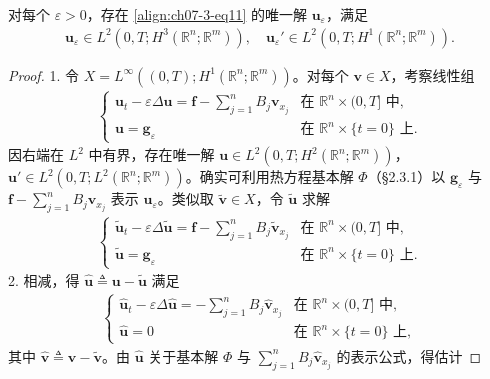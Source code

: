 \documentclass[../../main.tex]{subfiles}
\begin{document}
\begin{theorem}[逼近解的存在性]\label{theorem:ch07-3-1-逼近解存在}
对每个 $\varepsilon>0$，存在 \eqref{align:ch07-3-eq11} 的唯一解 $\mathbf{u}_\varepsilon$，满足
\begin{align}
\mathbf{u}_\varepsilon\in L^2(0,T;H^3(\mathbb{R}^n;\mathbb{R}^m)),\quad \mathbf{u}_\varepsilon{}'\in L^2(0,T;H^1(\mathbb{R}^n;\mathbb{R}^m)).\label{align:ch07-3-eq12}
\end{align}
\begin{proof}
1. 令 $X=L^\infty((0,T);H^1(\mathbb{R}^n;\mathbb{R}^m))$。对每个 $\mathbf{v}\in X$，考察线性组
\begin{align*}
\begin{cases}
\mathbf{u}_t-\varepsilon\Delta\mathbf{u}=\mathbf{f}-\sum_{j=1}^n B_j\mathbf{v}_{x_j}&\text{在 }\mathbb{R}^n\times(0,T]\text{ 中},\\
\mathbf{u}=\mathbf{g}_\varepsilon&\text{在 }\mathbb{R}^n\times\{t=0\}\text{ 上}.
\end{cases}
\end{align*}
因右端在 $L^2$ 中有界，存在唯一解 $\mathbf{u}\in L^2(0,T;H^2(\mathbb{R}^n;\mathbb{R}^m))$，$\mathbf{u}'\in L^2(0,T;L^2(\mathbb{R}^n;\mathbb{R}^m))$。确实可利用热方程基本解 $\Phi$（\S2.3.1）以 $\mathbf{g}_\varepsilon$ 与 $\mathbf{f}-\sum_{j=1}^n B_j\mathbf{v}_{x_j}$ 表示 $\mathbf{u}_\varepsilon$。类似取 $\widetilde{\mathbf{v}}\in X$，令 $\widetilde{\mathbf{u}}$ 求解
\begin{align*}
\begin{cases}
\widetilde{\mathbf{u}}_t-\varepsilon\Delta\widetilde{\mathbf{u}}=\mathbf{f}-\sum_{j=1}^n B_j\widetilde{\mathbf{v}}_{x_j}&\text{在 }\mathbb{R}^n\times(0,T]\text{ 中},\\
\widetilde{\mathbf{u}}=\mathbf{g}_\varepsilon&\text{在 }\mathbb{R}^n\times\{t=0\}\text{ 上}.
\end{cases}
\end{align*}
2. 相减，得 $\widehat{\mathbf{u}}\triangleq\mathbf{u}-\widetilde{\mathbf{u}}$ 满足
\begin{align}
\begin{cases}
\widehat{\mathbf{u}}_t-\varepsilon\Delta\widehat{\mathbf{u}}=-\sum_{j=1}^n B_j\widehat{\mathbf{v}}_{x_j}&\text{在 }\mathbb{R}^n\times(0,T]\text{ 中},\\
\widehat{\mathbf{u}}=0&\text{在 }\mathbb{R}^n\times\{t=0\}\text{ 上},
\end{cases}\label{align:ch07-3-eq13}
\end{align}
其中 $\widehat{\mathbf{v}}\triangleq\mathbf{v}-\widetilde{\mathbf{v}}$。由 $\widehat{\mathbf{u}}$ 关于基本解 $\Phi$ 与 $\sum_{j=1}^n B_j\widehat{\mathbf{v}}_{x_j}$ 的表示公式，得估计

\end{proof}
\end{theorem}
\end{document}
